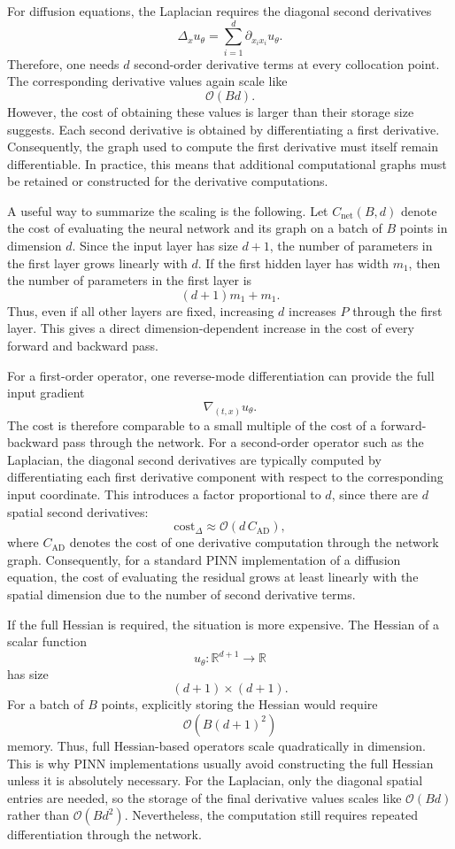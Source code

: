 For diffusion equations, the Laplacian requires the diagonal second derivatives
\[
    \Delta_x u_\theta
    =
    \sum_{i=1}^{d}
    \partial_{x_i x_i} u_\theta.
\]
Therefore, one needs $d$ second-order derivative terms at every collocation point. The corresponding derivative values again scale like
\[
    \mathcal{O}(Bd).
\]
However, the cost of obtaining these values is larger than their storage size suggests. Each second derivative is obtained by differentiating a first derivative. Consequently, the graph used to compute the first derivative must itself remain differentiable. In practice, this means that additional computational graphs must be retained or constructed for the derivative computations.

A useful way to summarize the scaling is the following. Let $C_{\mathrm{net}}(B,d)$ denote the cost of evaluating the neural network and its graph on a batch of $B$ points in dimension $d$. Since the input layer has size $d+1$, the number of parameters in the first layer grows linearly with $d$. If the first hidden layer has width $m_1$, then the number of parameters in the first layer is
\[
    (d+1)m_1 + m_1.
\]
Thus, even if all other layers are fixed, increasing $d$ increases $P$ through the first layer. This gives a direct dimension-dependent increase in the cost of every forward and backward pass.

For a first-order operator, one reverse-mode differentiation can provide the full input gradient
\[
    \nabla_{(t,x)}u_\theta.
\]
The cost is therefore comparable to a small multiple of the cost of a forward-backward pass through the network. For a second-order operator such as the Laplacian, the diagonal second derivatives are typically computed by differentiating each first derivative component with respect to the corresponding input coordinate. This introduces a factor proportional to $d$, since there are $d$ spatial second derivatives:
\[
    \mathrm{cost}_{\Delta}
    \approx
    \mathcal{O}
    \left(
        d \, C_{\mathrm{AD}}
    \right),
\]
where $C_{\mathrm{AD}}$ denotes the cost of one derivative computation through the network graph. Consequently, for a standard PINN implementation of a diffusion equation, the cost of evaluating the residual grows at least linearly with the spatial dimension due to the number of second derivative terms.

If the full Hessian is required, the situation is more expensive. The Hessian of a scalar function
\[
    u_\theta : \mathbb{R}^{d+1} \to \mathbb{R}
\]
has size
\[
    (d+1)\times(d+1).
\]
For a batch of $B$ points, explicitly storing the Hessian would require
\[
    \mathcal{O}\left(B(d+1)^2\right)
\]
memory. Thus, full Hessian-based operators scale quadratically in dimension. This is why PINN implementations usually avoid constructing the full Hessian unless it is absolutely necessary. For the Laplacian, only the diagonal spatial entries are needed, so the storage of the final derivative values scales like $\mathcal{O}(Bd)$ rather than $\mathcal{O}(Bd^2)$. Nevertheless, the computation still requires repeated differentiation through the network.

